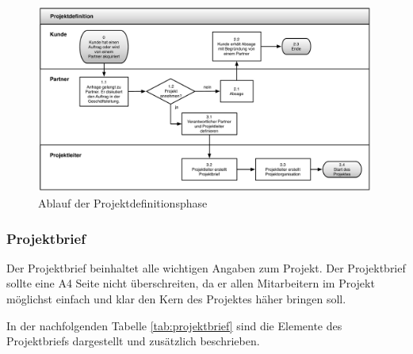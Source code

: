 \begin{figure}[htbp]
\begin{center}
\includegraphics[width=0.99\textwidth,angle=0]{./bilder/loesung/02_01_projektdefinition.pdf}
\caption[Ablauf der Projektdefinitionsphase]{Ablauf der Projektdefinitionsphase\footnotemark}
\label{pic:02_01_projektdefinition}
\end{center}
\end{figure}

\subsubsection{Projektbrief}
Der Projektbrief beinhaltet alle wichtigen Angaben zum Projekt. Der Projektbrief 
sollte eine A4 Seite nicht überschreiten, da er allen Mitarbeitern im Projekt 
möglichst einfach und klar den Kern des Projektes häher bringen soll.

In der nachfolgenden Tabelle \ref{tab:projektbrief} sind
die Elemente des Projektbriefs dargestellt und zusätzlich beschrieben.

